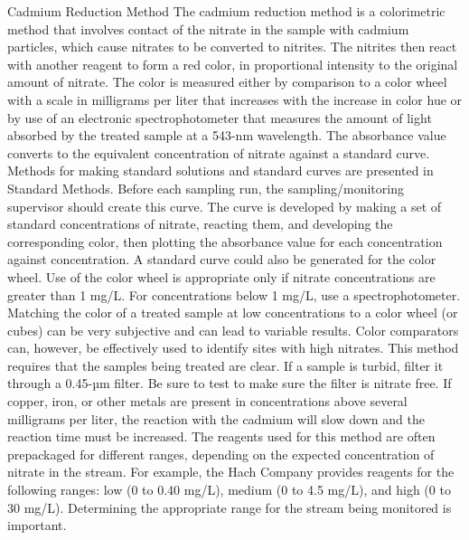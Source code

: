 \documentclass{article}
\begin{document}
Cadmium Reduction Method The cadmium reduction method is a colorimetric
method that involves contact of the nitrate in the sample with cadmium
particles, which cause nitrates to be converted to nitrites. The
nitrites then react with another reagent to form a red color, in
proportional intensity to the original amount of nitrate. The color is
measured either by comparison to a color wheel with a scale in
milligrams per liter that increases with the increase in color hue or by
use of an electronic spectrophotometer that measures the amount of light
absorbed by the treated sample at a 543-nm wavelength. The absorbance
value converts to the equivalent concentration of nitrate against a
standard curve. Methods for making standard solutions and standard
curves are presented in Standard Methods. Before each sampling run, the
sampling/monitoring supervisor should create this curve. The curve is
developed by making a set of standard concentrations of nitrate,
reacting them, and developing the corresponding color, then plotting the
absorbance value for each concentration against concentration. A
standard curve could also be generated for the color wheel. Use of the
color wheel is appropriate only if nitrate concentrations are greater
than 1 mg/L. For concentrations below 1 mg/L, use a spectrophotometer.
Matching the color of a treated sample at low concentrations to a color
wheel (or cubes) can be very subjective and can lead to variable
results. Color comparators can, however, be effectively used to identify
sites with high nitrates. This method requires that the samples being
treated are clear. If a sample is turbid, filter it through a 0.45-µm
filter. Be sure to test to make sure the filter is nitrate free. If
copper, iron, or other metals are present in concentrations above
several milligrams per liter, the reaction with the cadmium will slow
down and the reaction time must be increased. The reagents used for this
method are often prepackaged for different ranges, depending on the
expected concentration of nitrate in the stream. For example, the Hach
Company provides reagents for the following ranges: low (0 to 0.40
mg/L), medium (0 to 4.5 mg/L), and high (0 to 30 mg/L). Determining the
appropriate range for the stream being monitored is important.
\end{document}
